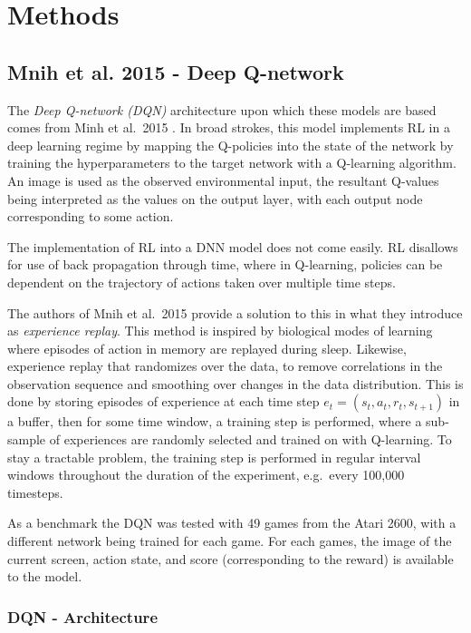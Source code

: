 \documentclass[journal,onecolumn]{IEEEtran}
\begin{document}
\section{Methods}\label{methods}

\subsection{Mnih et al. 2015 - Deep Q-network}

The \emph{Deep Q-network (DQN)} architecture upon which these models are
based comes from Minh et al.~2015
\autocite{mnihHumanlevelControlDeep2015}. In broad strokes, this
model implements RL in a deep learning regime by mapping the Q-policies
into the state of the network by training the hyperparameters to the
target network with a Q-learning algorithm. An image is used as the
observed environmental input, the resultant Q-values being interpreted
as the values on the output layer, with each output node corresponding
to some action.

The implementation of RL into a DNN model does not come easily. RL
disallows for use of back propagation through time, where in Q-learning,
policies can be dependent on the trajectory of actions taken over
multiple time steps.

The authors of Mnih et al.~2015 provide a solution to this in what they
introduce as \emph{experience replay}. This method is inspired by
biological modes of learning where episodes of action in memory are
replayed during sleep. Likewise, experience replay that randomizes over
the data, to remove correlations in the observation sequence and
smoothing over changes in the data distribution. This is done by storing
episodes of experience at each time step
\(e_{t}= (s_{t} , a_{t}, r_{t}, s_{t+1})\) in a buffer, then for some
time window, a training step is performed, where a sub-sample of
experiences are randomly selected and trained on with Q-learning. To stay a tractable problem, the training step is performed in regular
interval windows throughout the duration of the experiment, e.g.~every
100,000 timesteps.

As a benchmark the DQN was tested with 49 games from the Atari 2600,
with a different network being trained for each game. For each games,
the image of the current screen, action state, and score (corresponding
to the reward) is available to the model.

\subsubsection{DQN - Architecture}
\end{document}
